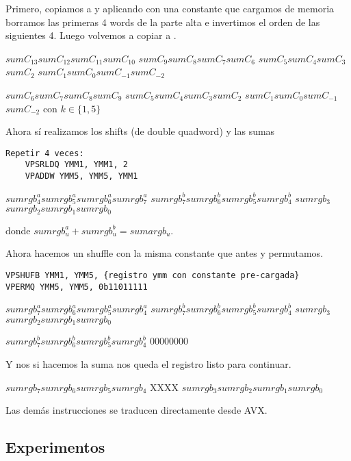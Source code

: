 Primero, copiamos  a  y aplicando  con una constante que cargamos de memoria borramos las primeras 4 words de la parte alta e invertimos el orden de las siguientes 4. Luego volvemos a copiar  a . 

 \ymmWord
{$sumC_{13}$}{$sumC_{12}$}{$sumC_{11}$}{$sumC_{10}$}
{$sumC_9$}{$sumC_8$}{$sumC_7$}{$sumC_6$}
{$sumC_5$}{$sumC_4$}{$sumC_3$}{$sumC_2$}
{$sumC_1$}{$sumC_0$}{$sumC_{-1}$}{$sumC_{-2}$}

 
{$sumC_6$}{$sumC_7$}{$sumC_8$}{$sumC_9$}
{$sumC_5$}{$sumC_4$}{$sumC_3$}{$sumC_2$}
{$sumC_1$}{$sumC_0$}{$sumC_{-1}$}{$sumC_{-2}$}
con $k \in \{1,5\}$

Ahora sí realizamos los shifts (de double quadword) y las sumas

\begin{lstlisting}
Repetir 4 veces:
    VPSRLDQ YMM1, YMM1, 2
    VPADDW YMM5, YMM5, YMM1
\end{lstlisting}

 
{$sumrgb^a_4$}{$sumrgb^a_5$}{$sumrgb^a_6$}{$sumrgb^a_7$}
{$sumrgb^b_7$}{$sumrgb^b_6$}{$sumrgb^b_5$}{$sumrgb^b_4$}
{$sumrgb_3$}{$sumrgb_2$}{$sumrgb_1$}{$sumrgb_0$}

donde $sumrgb^a_u + sumrgb^b_u = sumargb_u$.

Ahora hacemos un shuffle con la misma constante que antes y permutamos.

\begin{lstlisting}
VPSHUFB YMM1, YMM5, {registro ymm con constante pre-cargada}
VPERMQ YMM5, YMM5, 0b11011111
\end{lstlisting}

 
{$sumrgb^a_7$}{$sumrgb^a_6$}{$sumrgb^a_5$}{$sumrgb^a_4$}
{$sumrgb^b_7$}{$sumrgb^b_6$}{$sumrgb^b_5$}{$sumrgb^b_4$}
{$sumrgb_3$}{$sumrgb_2$}{$sumrgb_1$}{$sumrgb_0$}

 
{$sumrgb^b_7$}{$sumrgb^b_6$}{$sumrgb^b_5$}{$sumrgb^b_4$}
{0}{0}{0}{0}{0}{0}{0}{0}

Y nos si hacemos la suma nos queda el registro listo para continuar.

 
{$sumrgb_7$}{$sumrgb_6$}{$sumrgb_5$}{$sumrgb_4$}
{X}{X}{X}{X}
{$sumrgb_3$}{$sumrgb_2$}{$sumrgb_1$}{$sumrgb_0$}

Las demás instrucciones se traducen directamente desde AVX.

\subsection{Experimentos}

